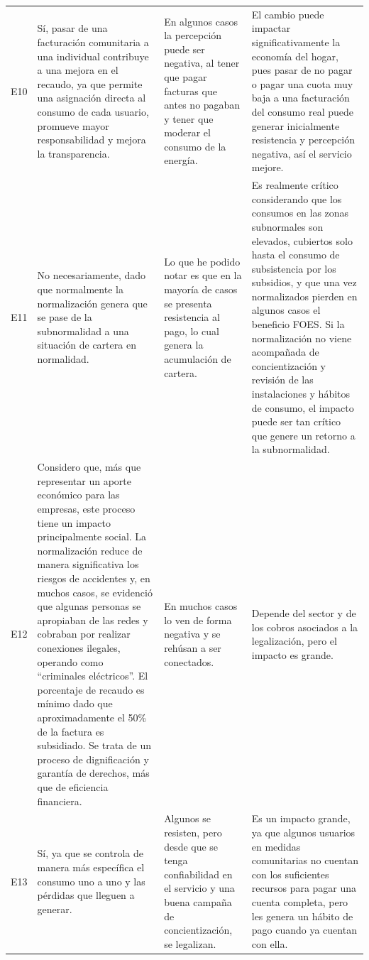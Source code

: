 \begin{longtable}{>{\centering}p{0.7cm}
                  >{\RaggedRight}p{4.5cm}
                  >{\RaggedRight}p{4.5cm}
                  >{\RaggedRight\arraybackslash}p{4.5cm}}
\rowcolor{grisclaro}
E10 & Sí, pasar de una facturación comunitaria a una individual contribuye a una mejora en el recaudo, ya que permite una asignación directa al consumo de cada usuario, promueve mayor responsabilidad y mejora la transparencia. & En algunos casos la percepción puede ser negativa, al tener que pagar facturas que antes no pagaban y tener que moderar el consumo de la energía. & El cambio puede impactar significativamente la economía del hogar, pues pasar de no pagar o pagar una cuota muy baja a una facturación del consumo real puede generar inicialmente resistencia y percepción negativa, así el servicio mejore. \\
E11 & No necesariamente, dado que normalmente la normalización genera que se pase de la subnormalidad a una situación de cartera en normalidad. & Lo que he podido notar es que en la mayoría de casos se presenta resistencia al pago, lo cual genera la acumulación de cartera. & Es realmente crítico considerando que los consumos en las zonas subnormales son elevados, cubiertos solo hasta el consumo de subsistencia por los subsidios, y que una vez normalizados pierden en algunos casos el beneficio FOES. Si la normalización no viene acompañada de concientización y revisión de las instalaciones y hábitos de consumo, el impacto puede ser tan crítico que genere un retorno a la subnormalidad. \\
\rowcolor{grisclaro}
E12 & Considero que, más que representar un aporte económico para las empresas, este proceso tiene un impacto principalmente social. La normalización reduce de manera significativa los riesgos de accidentes y, en muchos casos, se evidenció que algunas personas se apropiaban de las redes y cobraban por realizar conexiones ilegales, operando como ``criminales eléctricos''. El porcentaje de recaudo es mínimo dado que aproximadamente el 50\% de la factura es subsidiado. Se trata de un proceso de dignificación y garantía de derechos, más que de eficiencia financiera. & En muchos casos lo ven de forma negativa y se rehúsan a ser conectados. & Depende del sector y de los cobros asociados a la legalización, pero el impacto es grande. \\
E13 & Sí, ya que se controla de manera más específica el consumo uno a uno y las pérdidas que lleguen a generar. & Algunos se resisten, pero desde que se tenga confiabilidad en el servicio y una buena campaña de concientización, se legalizan. & Es un impacto grande, ya que algunos usuarios en medidas comunitarias no cuentan con los suficientes recursos para pagar una cuenta completa, pero les genera un hábito de pago cuando ya cuentan con ella. \\

\end{longtable}
